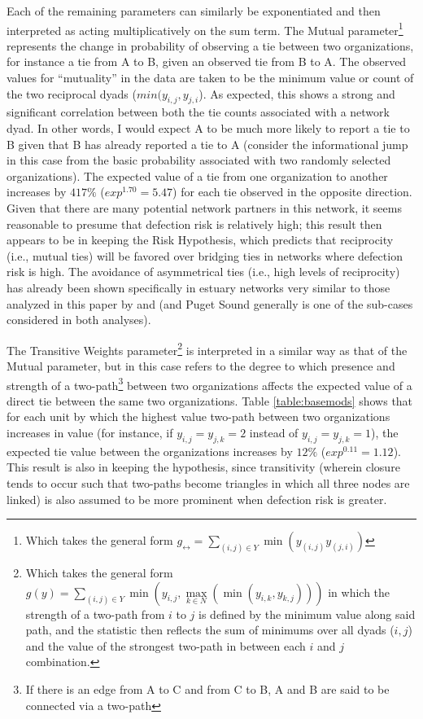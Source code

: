 \documentclass[12pt,a4paper,titlepage]{article}
\begin{document}


Each of the remaining parameters can similarly be exponentiated and then interpreted as acting multiplicatively on the sum term. The Mutual parameter\footnote{Which takes the general form $g_{\leftrightarrow} = \sum_{(i,j) \in Y} \min{( y_{(i,j)} y_{(j,i)})}$} represents the change in probability of observing a tie between two organizations, for instance a tie from A to B, given an observed tie from B to A. The observed values for “mutuality” in the data are taken to be the minimum value or count of the two reciprocal dyads ($min(y_{i,j},y_{j,i}$). As expected, this shows a strong and significant correlation between both the tie counts associated with a network dyad. In other words, I would expect A to be much more likely to report a tie to B given that B has already reported a tie to A (consider the informational jump in this case from the basic probability associated with two randomly selected organizations). The expected value of a tie from one organization to another increases by $417\%$ ($exp^{1.70} = 5.47$) for each tie observed in the opposite direction. Given that there are many potential network partners in this network, it seems reasonable to presume that defection risk is relatively high; this result then appears to be in keeping the \textcite{berardo2010} Risk Hypothesis, which predicts that reciprocity (i.e., mutual ties) will be favored over bridging ties in networks where defection risk is high. The avoidance of asymmetrical ties (i.e., high levels of reciprocity) has already been shown specifically in estuary networks very similar to those analyzed in this paper by \textcite{berardo2010} and \textcite{desmarais2012} (and Puget Sound generally is one of the sub-cases considered in both analyses).  

The Transitive Weights parameter\footnote{Which takes the general form $g(y) = \sum_{(i,j) \in Y} \min(y_{i,j},\max\limits_{k \in N}(\min(y_{i,k},y_{k,j})))$ in which the strength of a two-path from $i$ to $j$ is defined by the minimum value along said path, and the statistic then reflects the sum of minimums over all dyads ($i, j$) and the value of the strongest two-path in between each $i$ and $j$ combination.} is interpreted in a similar way as that of the Mutual parameter, but in this case refers to the degree to which presence and strength of a two-path\footnote{If there is an edge from A to C and from C to B, A and B are said to be connected via a two-path} between two organizations affects the expected value of a direct tie between the same two organizations. Table \ref{table:basemods} shows that for each unit by which the highest value two-path between two organizations increases in value (for instance, if $y_{i,j} = y_{j,k} = 2$ instead of $y_{i,j} = y_{j,k} = 1$), the expected tie value between the organizations increases by $12\%$ ($exp^{0.11} = 1.12$). This result is also in keeping the \textcite{berardo2010} hypothesis, since transitivity (wherein closure tends to occur such that two-paths become triangles in which all three nodes are linked) is also assumed to be more prominent when defection risk is greater. 
\end{document}
